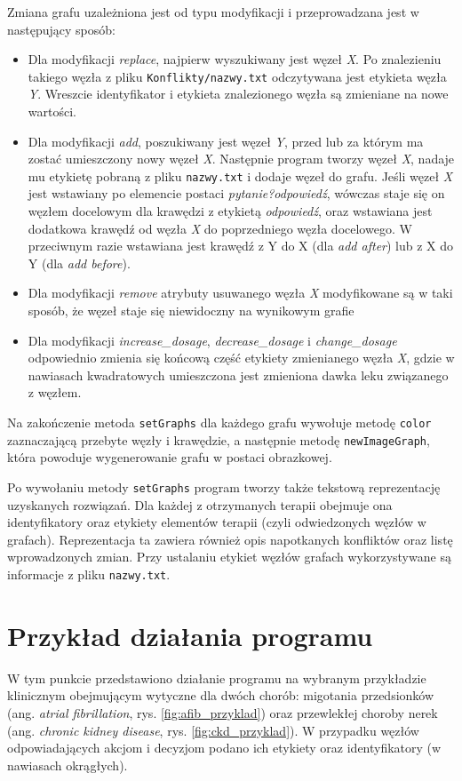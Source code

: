 Zmiana grafu uzależniona jest od typu modyfikacji i przeprowadzana jest w następujący sposób:
\begin{itemize}
\item Dla modyfikacji \textit{replace}, najpierw wyszukiwany jest węzeł \textit{X}. Po znalezieniu takiego węzła z pliku \texttt{Konflikty/nazwy.txt} odczytywana jest etykieta węzła \textit{Y}. Wreszcie identyfikator i etykieta znalezionego węzła są zmieniane na nowe wartości. 
\item Dla modyfikacji \textit{add}, poszukiwany jest węzeł \textit{Y}, przed lub za którym ma zostać umieszczony nowy węzeł \textit{X}. Następnie program tworzy węzeł \textit{X}, nadaje mu etykietę pobraną z pliku \texttt{nazwy.txt} i dodaje węzeł do grafu. Jeśli węzeł \textit{X} jest wstawiany po elemencie postaci \textit{pytanie?odpowiedź}, wówczas staje się on węzłem docelowym dla krawędzi z etykietą \textit{odpowiedź}, oraz wstawiana jest dodatkowa krawędź od węzła \textit{X} do poprzedniego węzła docelowego. W przeciwnym razie wstawiana jest krawędź z Y do X (dla \textit{add after}) lub z X do Y (dla \textit{add before}).
\item Dla modyfikacji \textit{remove} atrybuty usuwanego węzła \textit{X} modyfikowane są w taki sposób, że węzeł staje się niewidoczny na wynikowym grafie
\item Dla modyfikacji \textit{increase\_dosage}, \textit{decrease\_dosage} i \textit{change\_dosage} odpowiednio zmienia się końcową część etykiety zmienianego węzła \textit{X}, gdzie w nawiasach kwadratowych umieszczona jest zmieniona dawka leku związanego z węzłem. 

\end{itemize}

Na zakończenie metoda \texttt{setGraphs} dla każdego grafu wywołuje metodę \texttt{color} zaznaczającą przebyte węzły i krawędzie, a następnie metodę \texttt{newImageGraph}, która powoduje wygenerowanie grafu w postaci obrazkowej. 

Po wywołaniu metody \texttt{setGraphs} program tworzy także tekstową reprezentację uzyskanych rozwiązań. Dla każdej z otrzymanych terapii obejmuje ona identyfikatory oraz etykiety elementów terapii (czyli odwiedzonych węzłów w grafach). Reprezentacja ta zawiera również opis napotkanych konfliktów oraz listę wprowadzonych zmian. Przy ustalaniu etykiet węzłów grafach wykorzystywane są informacje z pliku \texttt{nazwy.txt}.


\section{Przykład działania programu}
W tym punkcie przedstawiono działanie programu na wybranym przykładzie klinicznym obejmującym wytyczne dla dwóch chorób: migotania przedsionków (ang. \textit{atrial fibrillation}, rys. \ref{fig:afib_przyklad}) oraz przewlekłej choroby nerek (ang. \textit{chronic kidney disease}, rys. \ref{fig:ckd_przyklad}). W przypadku węzłów odpowiadających akcjom i decyzjom podano ich etykiety oraz identyfikatory (w nawiasach okrągłych).

